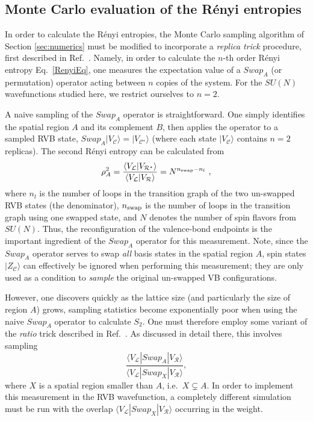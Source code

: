 \documentclass[11pt]{iopart}
\begin{document}
\subsection{Monte Carlo evaluation of the R\'enyi entropies}
\label{sec:su2_numerics}

In order to calculate the R\'enyi entropies, the Monte Carlo sampling algorithm of Section \ref{sec:numerics} must be modified to incorporate
a {\it replica trick} procedure, first described in Ref.~\cite{swap}.  Namely, in order to calculate the $n$-th order R\'enyi entropy Eq.~\ref{RenyiEq}, one measures the expectation value of a $Swap_A$ (or permutation) operator acting between $n$ copies of the system.  For the $SU(N)$ wavefunctions studied here, we restrict ourselves to $n=2$.  

A naive sampling of the $Swap_A$ operator is straightforward.  One simply identifies the spatial region $A$ and its complement $B$, then applies the operator to a sampled RVB state, $Swap_A |V_{\mathcal C} \rangle =  |V_{\mathcal C^{\star}} \rangle$ (where each state $|V_{\mathcal C} \rangle$ contains $n=2$ replicas).  The second R\'enyi entropy can be calculated from \cite{swap}
\begin{equation}
	\rho_A^2
		= \frac{\langle V_{\mathcal{L}} | V_{\mathcal{R}^{\star}} \rangle}
			{\langle V_{\mathcal{L}} | V_{\mathcal{R}} \rangle} 
			 = N^{n_{\rm swap} - n_l}\ ,
\end{equation}
where $n_l$ is the number of loops in the transition graph of the two un-swapped RVB states (the denominator), $n_{\rm swap}$ is the number of loops in the transition graph using one swapped state, and $N$ denotes the number of spin flavors from $SU(N)$.  
Thus, the reconfiguration of the valence-bond endpoints is the important ingredient of the $Swap_A$ operator for this measurement.  Note, 
since the $Swap_A$ operator serves to swap {\it all} basis states in the spatial region $A$, spin states $|Z_{\mathcal C} \rangle$ can effectively be ignored when performing this measurement; they are only used as a condition to {\it sample} the original un-swapped VB configurations.

However, one discovers quickly as the lattice size (and particularly the size of region $A$) grows, sampling statistics become exponentially poor when using the naive $Swap_A$ operator to calculate $S_2$.  One must therefore employ some variant of the {\it ratio} trick described in  Ref.~\cite{swap}.  As discussed in detail there, this involves sampling 
\begin{equation}
 \frac{\langle V_{\mathcal{L}} | Swap_A | V_{\mathcal{R}} \rangle}
			{\langle V_{\mathcal{L}} | Swap_X | V_{\mathcal{R}} \rangle},
\end{equation}
where $X$ is a spatial region smaller than $A$, i.e.~$X \subsetneq A$.  In order to implement this measurement in the RVB wavefunction, a completely different simulation must be run with the overlap ${\langle V_{\mathcal{L}} | Swap_X | V_{\mathcal{R}} \rangle}$ occurring in the weight.  
\end{document}
